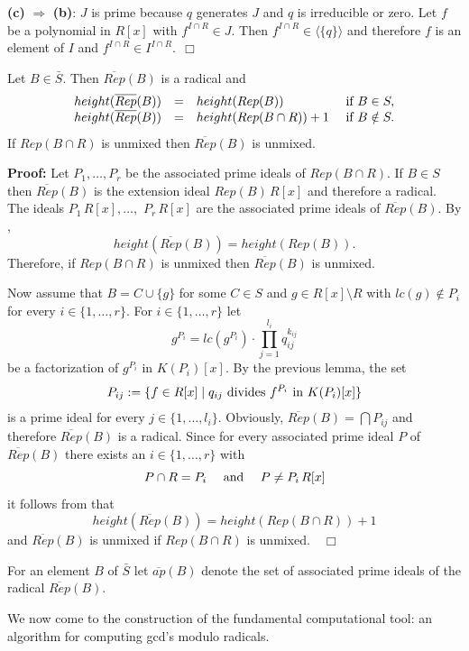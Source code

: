 \noindent
{\bf (c)} $\Rightarrow$ {\bf (b)}: 
$J$ is prime because $q$ generates $J$ and $q$ is irreducible or zero.
Let $f$ be a polynomial in $R[x]$ 
with $f^{I\cap R}\in J$. Then $f^{I\cap R}\in 
\langle\{q\}\rangle$
and therefore $f$ is an element of $I$ and 
$f^{I\cap R}\in I^{I\cap R}.\ \ \Box$

\medskip
\begin{lemma} Let $B\in\bar{S}$. Then $\overline{Rep}(B)$ is a radical and
\[
\begin{array}{llll} 
height(\overline{Rep}(B)) & = & height(Rep(B)) & \hbox{ if } B\in S, \\
height(\overline{Rep}(B)) & = & height(Rep(B\cap R))+1 & 
\hbox{ if } B\notin S. 
\end{array}
\]
If $Rep(B\cap R)$ is unmixed then $\overline{Rep}(B)$ is unmixed.
\end{lemma}
{\bf Proof:} 
Let $P_1,\ldots,P_r$ be the associated prime ideals of $Rep(B\cap R)$.
If $B\in S$ then $\overline{Rep}(B)$ is the extension ideal $Rep(B)\, R[x]$
and therefore a radical. The ideals
$P_1\, R[x],\ldots,$ $P_r\, R[x]$ are the associated prime ideals
of $\overline{Rep}(B)$. By \cite[Theorem 149]{Kapl70}, 
\[ height(\overline{Rep}(B))=height(Rep(B)). \]
Therefore, if $Rep(B\cap R)$ is unmixed then $\overline{Rep}(B)$ is unmixed.

Now assume that $B=C\cup\{g\}$ for
some $C\in S$ and $g\in R[x]\setminus R$ with
$lc(g)\notin P_i$ for every $i\in\{1,\ldots,r\}$.
For $i\in\{1,\ldots,r\}$ let 
\[ g^{P_i}=lc(g^{P_i})\cdot\prod_{j=1}^{l_i} q_{ij}^{k_{ij}} \]
be
a factorization of $g^{P_i}$ in $K(P_i)[x]$. By the previous lemma, the set
\[ P_{ij}:=\{f\in R[x]\mid q_{ij} \hbox{ divides } f^{P_i} \hbox{ in }
K(P_i)[x]\} \] 
is a prime ideal 
for every $j\in\{1,\ldots,l_i\}$. Obviously, 
$\overline{Rep}(B)=\bigcap P_{ij}$ and therefore $\overline{Rep}(B)$
is a radical.
Since 
for every associated prime ideal $P$ of $\overline{Rep}(B)$ 
there exists an $i\in\{1,\ldots,r\}$ with 
\[ P\cap R=P_i\ \ \  \hbox{ and }\ \ \ 
P\not= P_i\, R[x] \]
it follows from \cite[Theorem 149]{Kapl70} that 
\[ height(\overline{Rep}(B))=height(Rep(B\cap R))+1 \] 
and $\overline{Rep}(B)$ is unmixed if $Rep(B\cap R)$ is unmixed.\ \ $\Box$


\bigskip
For an element $B$ of $\bar{S}$ let $\overline{ap}(B)$ denote the set of 
associated prime ideals
of the radical $\overline{Rep}(B)$. 

\smallskip
We now come to the construction of the fundamental computational tool: 
an algorithm for computing gcd's modulo radicals.

